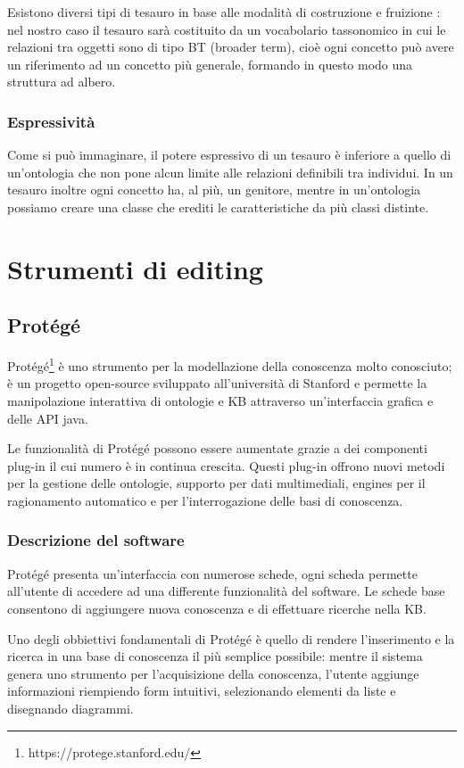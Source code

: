 Esistono diversi tipi di tesauro in base alle modalità di costruzione e fruizione \cite{kilgarriff2000s}: nel nostro caso il tesauro sarà costituito da un vocabolario tassonomico in cui le relazioni tra oggetti sono di tipo BT (broader term), cioè ogni concetto può avere un riferimento ad un concetto più generale, formando in questo modo una struttura ad albero. 
\subsubsection{Espressività}
Come si può immaginare, il potere espressivo di un tesauro è inferiore a quello di un'ontologia che non pone alcun limite alle relazioni definibili tra individui. In un tesauro inoltre ogni concetto ha, al più, un genitore, mentre in un'ontologia possiamo creare una classe che erediti le caratteristiche da più classi distinte.
\section{Strumenti di editing}

\subsection{Protégé}
Protégé\footnote{https://protege.stanford.edu/} è uno strumento per la modellazione della conoscenza molto conosciuto; è un progetto open-source sviluppato all'università di Stanford e permette la manipolazione interattiva di ontologie e KB attraverso un'interfaccia grafica e delle API java.

Le funzionalità di Protégé possono essere aumentate grazie a dei componenti plug-in il cui numero è in continua crescita. Questi plug-in offrono nuovi metodi per la gestione delle ontologie, supporto per dati multimediali, engines per il ragionamento automatico e per l'interrogazione delle basi di conoscenza\cite{sivakumar2011ontology}.
\subsubsection{Descrizione del software}
Protégé presenta un'interfaccia con numerose schede, ogni scheda permette all'utente di accedere ad una differente funzionalità del software. Le schede base consentono di aggiungere nuova conoscenza e di effettuare ricerche nella KB.

Uno degli obbiettivi fondamentali di Protégé è quello di rendere l'inserimento e la ricerca in una base di conoscenza il più semplice possibile: mentre il sistema genera uno strumento per l'acquisizione della conoscenza, l'utente aggiunge informazioni riempiendo form intuitivi, selezionando elementi da liste e disegnando diagrammi.

